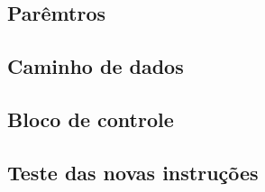 \documentclass[12pt]{article}
\begin{document}
\subsection{Parêmtros}
\label{subsec:param}


\subsection{Caminho de dados}
\label{subsec:datapath}


\subsection{Bloco de controle}
\label{subsec:control}


\subsection{Teste das novas instruções}
\label{subsec:testeisa}




\end{document}
